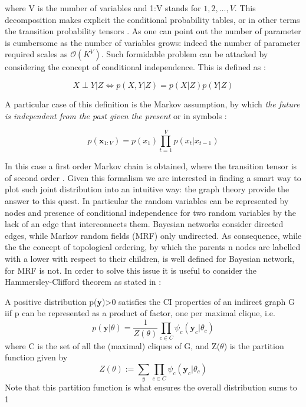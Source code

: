 \documentclass[12pt,%
               a4paper,%
               oneside,openany,%
               titlepage,%
               headinclude,footinclude,%
               BCOR5mm,%
               cleardoublepage=empty,%
               tablecaptionabove,%
               floatperchapter,
               ]{scrreprt}                 %
\begin{document}
where V is the number of variables and 1:V stands for ${1,2,...,V}$.  This decomposition makes explicit the conditional probability tables, or in other terms the transition probability tensors \cite{wu2017markov}.  As one can point out the number of parameter is cumbersome as the number of variables grows: indeed the number of parameter required scales as $\mathcal{O}(K^{V})$. 
Such formidable problem can be attacked by considering the concept of conditional independence.  This is defined as  \cite{murphy2012machine}:

\begin{equation}
X  \perp Y| Z \iff  p(X,Y|Z) = p(X|Z)p(Y|Z)
\end{equation}

A particular case of this definition is the Markov assumption,  by which \textit{the future is independent from the past given the present } or in symbols \cite{murphy2012machine}: 

\begin{equation}
p(\textbf{x}_{1:V})=p(x_{1})\prod^{V}_{t=1}p(x_{t}|x_{t-1})
\end{equation}

In this case a first order Markov chain is obtained,  where the transition tensor is of second order \cite{wu2017markov}.  Given this formalism we are interested in finding a smart way to plot such joint distribution into an intuitive way: the graph theory provide the answer to this quest.  In particular the random variables can be represented by nodes and presence of conditional independence for two random variables by the lack of an edge that interconnects them.  Bayesian networks consider directed edges,  while Markov random fields (MRF) only undirected.  As consequence,  while the the concept of topological ordering,  by which the parents n nodes are labelled with a lower  with respect to their children,  is well defined for Bayesian network,  for MRF is not.  In order to solve this issue it is useful to consider the Hammersley-Clifford theorem as stated in \cite{murphy2012machine}:

\begin{theorem}
A positive distribution p(\textbf{y})>0 satisfies the CI properties of an indirect graph G iif p can be represented as a product of factor, one per maximal clique,  i.e.
\begin{equation}
p(\textbf{y}|\theta)= \dfrac{1}{Z(\theta)}\prod_{c \in C }\psi_{c}(\textbf{y}_{c}|\theta_{c})
\end{equation}
where C is the set of all the (maximal) cliques of G,  and Z($\theta$) is the partition function given by 
\begin{equation}
Z(\theta):= \sum_{y}\prod_{c\in C}\psi_{c}(\textbf{y}_{c}|\theta_{c})
\end{equation}
Note that this partition function is what ensures the overall distribution sums to 1
\end{theorem}
\end{document}
